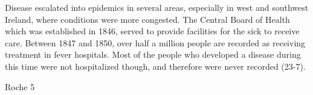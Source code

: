 \begin{Spacing}{1.5}
\begin{adjustwidth}{.8in}{0in}
\end{adjustwidth}


Disease escalated into epidemics in several areas, especially in west and southwest Ireland, where conditions were more congested. The Central Board of Health which was established in 1846, served to provide facilities for the sick to receive care. Between 1847 and 1850, over half a million people are recorded as receiving treatment in fever hospitals. Most of the people who developed a disease during this time were not hospitalized though, and therefore were never recorded (23-7). 

\newpage
\thispagestyle{empty}
\begin{flushright}Roche 5\end{flushright}


\end{Spacing}
